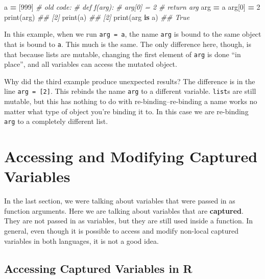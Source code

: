 \documentclass[12pt,krantz2]{krantz}
\makeatletter
\newenvironment{Shaded}{\begin{snugshade}}{\end{snugshade}}
\newcommand{\BuiltInTok}[1]{#1}
\newcommand{\CommentTok}[1]{\textcolor[rgb]{0.37,0.37,0.37}{\textit{#1}}}
\newcommand{\DecValTok}[1]{\textcolor[rgb]{0.06,0.06,0.06}{#1}}
\newcommand{\KeywordTok}[1]{\textcolor[rgb]{0.27,0.27,0.27}{\textbf{#1}}}
\newcommand{\NormalTok}[1]{#1}
\newcommand{\OperatorTok}[1]{\textcolor[rgb]{0.43,0.43,0.43}{\textbf{#1}}}
\newenvironment{kframe}{%
\medskip{}
\setlength{\fboxsep}{.8em}
 \def\at@end@of@kframe{}%
 \ifinner\ifhmode%
  \def\at@end@of@kframe{\end{minipage}}%
  \begin{minipage}{\columnwidth}%
 \fi\fi%
 \def\FrameCommand##1{\hskip\@totalleftmargin \hskip-\fboxsep
 \colorbox{shadecolor}{##1}\hskip-\fboxsep
     \hskip-\linewidth \hskip-\@totalleftmargin \hskip\columnwidth}%
 \MakeFramed {\advance\hsize-\width
   \@totalleftmargin\z@ \linewidth\hsize
   \@setminipage}}%
 {\par\unskip\endMakeFramed%
 \at@end@of@kframe}
\renewenvironment{Shaded}{\begin{kframe}}{\end{kframe}}
\makeatother
\begin{document}
\begin{Shaded}
\begin{Highlighting}[]
\NormalTok{a }\OperatorTok{=}\NormalTok{ [}\DecValTok{999}\NormalTok{]}
\CommentTok{# old code:}
\CommentTok{# def f(arg):}
\CommentTok{#     arg[0] = 2}
\CommentTok{#     return arg}
\NormalTok{arg }\OperatorTok{=}\NormalTok{ a}
\NormalTok{arg[}\DecValTok{0}\NormalTok{] }\OperatorTok{=} \DecValTok{2}
\BuiltInTok{print}\NormalTok{(arg)}
\CommentTok{## [2]}
\BuiltInTok{print}\NormalTok{(a)}
\CommentTok{## [2]}
\BuiltInTok{print}\NormalTok{(arg }\KeywordTok{is}\NormalTok{ a)}
\CommentTok{## True}
\end{Highlighting}
\end{Shaded}

In this example, when we run \texttt{arg\ =\ a}, the name \texttt{arg} is bound to the same object that is bound to \texttt{a}. This much is the same. The only difference here, though, is that because lists are mutable, changing the first element of \texttt{arg} is done ``in place'', and all variables can access the mutated object.

Why did the third example produce unexpected results? The difference is in the line \texttt{arg\ =\ {[}2{]}}. This rebinds the name \texttt{arg} to a different variable. \texttt{list}s are still mutable, but this has nothing to do with re-binding--re-binding a name works no matter what type of object you're binding it to. In this case we are re-binding \texttt{arg} to a completely different list.

\hypertarget{accessing-and-modifying-captured-variables}{%
\section{Accessing and Modifying Captured Variables}\label{accessing-and-modifying-captured-variables}}

In the last section, we were talking about variables that were passed in as function arguments. Here we are talking about variables that are \textbf{captured}. They are not passed in as variables, but they are still used inside a function. In general, even though it is possible to access and modify non-local captured variables in both languages, it is not a good idea.

\hypertarget{accessing-captured-variables-in-r}{%
\subsection{Accessing Captured Variables in R}\label{accessing-captured-variables-in-r}}
\end{document}
